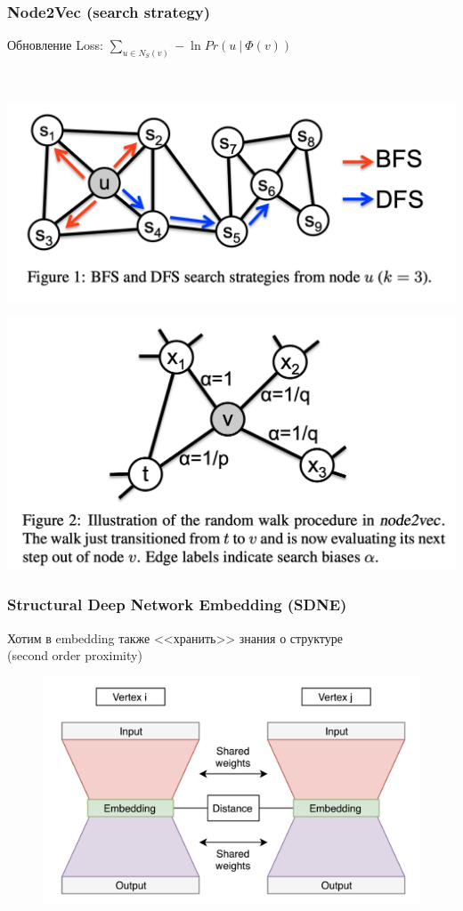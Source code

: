 \documentclass{beamer}
\newcommand{\skipline}[0]{$ $\\}
\begin{document}
\begin{frame}
    \frametitle{Node2Vec (search strategy)}
    \begin{block}{Обновление}
        Loss: $\sum_{u \in N_S  (v)} -\ln Pr\left(u \ \vert\ \varPhi(v)\right)$
    \end{block}
    \skipline
    \begin{multicols}{2}
        \includegraphics[width=1\columnwidth]{bfs_dfs.png}\par 
        \includegraphics[width=1\columnwidth]{step.png}\par 
    \end{multicols}
\end{frame}

\begin{frame}
    \frametitle{Structural Deep Network Embedding (SDNE)}
    Хотим в embedding также <<хранить>> знания о структуре\\ (second order proximity)
    \begin{figure}
        \includegraphics[width=0.75\columnwidth]{SDNE.png}
    \end{figure}
\end{frame}
\end{document}
